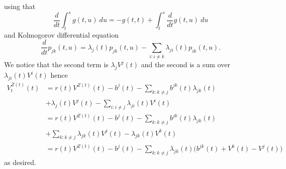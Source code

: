 \documentclass[
]{book}
\begin{document}
using that
\[
\frac{d}{dt}\int_t^s g(t,u)\ du=-g(t,t)+\int_t^s\frac{d}{dt}g(t,u)\ du
\]
and Kolmogorov differential equation
\[
\frac{d}{dt}p_{jk}(t,u)=\lambda_{j}(t)p_{jk}(t,u)-\sum_{i:i\ne k}\lambda_{ji}(t)p_{ik}(t,u).
\]
We notice that the second term is \(\lambda_jV^j(t)\) and the second is a sum over \(\lambda_{ji}(t)V^i(t)\) hence
\begin{align*}
V_t^{Z(t)}(t)&=r(t)V^{Z(t)}(t)-b^j(t)-\sum_{k :k \ne j}  b^{jk}(t)\lambda_{jk }(t)\\
&+\lambda_j(t)V^j(t)-\sum_{i:i\ne j}\lambda_{ji}(t)V^i(t)\\
&=r(t)V^{Z(t)}(t)-b^j(t)-\sum_{k :k \ne j}  b^{jk}(t)\lambda_{jk }(t)\\
&+\sum_{k:k\ne j}\lambda_{jk}(t)V^j(t)-\lambda_{jk}(t)V^k(t)\\
&=r(t)V^{Z(t)}(t)-b^j(t)-\sum_{k :k \ne j}\lambda_{jk }(t)\Big(b^{jk}(t)+V^k(t)-V^j(t)\Big)
\end{align*}
as desired.
\end{document}
